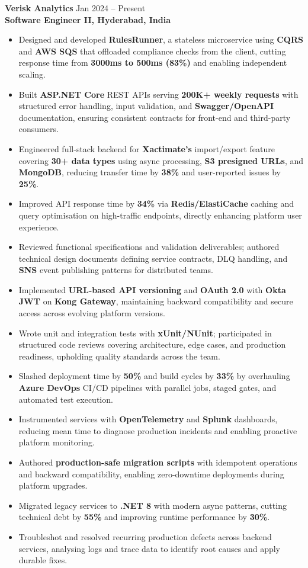 \documentclass[a4paper,10pt]{article}
\begin{document}
\textbf{Verisk Analytics} \hfill Jan 2024 -- Present \\
\textbf{Software Engineer II, Hyderabad, India}
\begin{itemize}[leftmargin=*]
    \item Designed and developed \textbf{RulesRunner}, a stateless microservice using \textbf{CQRS} and \textbf{AWS SQS} that offloaded compliance checks from the client, cutting response time from \textbf{3000ms to 500ms (83\%)} and enabling independent scaling.
    \item Built \textbf{ASP.NET Core} REST APIs serving \textbf{200K+ weekly requests} with structured error handling, input validation, and \textbf{Swagger/OpenAPI} documentation, ensuring consistent contracts for front-end and third-party consumers.
    \item Engineered full-stack backend for \textbf{Xactimate's} import/export feature covering \textbf{30+ data types} using async processing, \textbf{S3 presigned URLs}, and \textbf{MongoDB}, reducing transfer time by \textbf{38\%} and user-reported issues by \textbf{25\%}.
    \item Improved API response time by \textbf{34\%} via \textbf{Redis/ElastiCache} caching and query optimisation on high-traffic endpoints, directly enhancing platform user experience.
    \item Reviewed functional specifications and validation deliverables; authored technical design documents defining service contracts, DLQ handling, and \textbf{SNS} event publishing patterns for distributed teams.
    \item Implemented \textbf{URL-based API versioning} and \textbf{OAuth 2.0} with \textbf{Okta JWT} on \textbf{Kong Gateway}, maintaining backward compatibility and secure access across evolving platform versions.
    \item Wrote unit and integration tests with \textbf{xUnit/NUnit}; participated in structured code reviews covering architecture, edge cases, and production readiness, upholding quality standards across the team.
    \item Slashed deployment time by \textbf{50\%} and build cycles by \textbf{33\%} by overhauling \textbf{Azure DevOps} CI/CD pipelines with parallel jobs, staged gates, and automated test execution.
    \item Instrumented services with \textbf{OpenTelemetry} and \textbf{Splunk} dashboards, reducing mean time to diagnose production incidents and enabling proactive platform monitoring.
    \item Authored \textbf{production-safe migration scripts} with idempotent operations and backward compatibility, enabling zero-downtime deployments during platform upgrades.
    \item Migrated legacy services to \textbf{.NET 8} with modern async patterns, cutting technical debt by \textbf{55\%} and improving runtime performance by \textbf{30\%}.
    \item Troubleshot and resolved recurring production defects across backend services, analysing logs and trace data to identify root causes and apply durable fixes.
\end{itemize}
\end{document}
